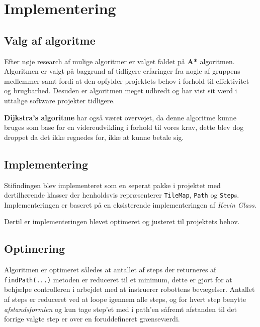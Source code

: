 \chapter{Implementering}

\section{Valg af algoritme}
Efter nøje research af mulige algoritmer er valget faldet på \textbf{A*} algoritmen.
Algoritmen er valgt på baggrund af tidligere erfaringer fra nogle af gruppens medlemmer samt fordi at den opfylder projektets behov i forhold til effektivitet og brugbarhed. Desuden er algoritmen meget udbredt og har vist sit værd i uttalige software projekter tidligere.

\textbf{Dijkstra's algoritme} har også været overvejet, da denne algoritme kunne bruges som base for en videreudvikling i forhold til vores krav, dette blev dog droppet da det ikke regnedes for, ikke at kunne betale sig.

\section{Implementering}
Stifindingen blev implementeret som en seperat pakke i projektet med dertilhørende klasser der henholdsvis repræsenterer \texttt{TileMap}, \texttt{Path} og \texttt{Step}s. Implementeringen er baseret på en eksisterende implementeringen af \textit{Kevin Glass}.

Dertil er implementeringen blevet optimeret og justeret til projektets behov.

\section{Optimering}
Algoritmen er optimeret således at antallet af steps der returneres af \texttt{findPath(...)} metoden er reduceret til et minimum, dette er gjort for at behjælpe controlleren i arbejdet med at instruerer robottens bevægelser. Antallet af steps er reduceret ved at loope igennem alle steps, og for hvert step benytte \textit{afstandsformlen} og kun tage step'et med i path'en såfremt afstanden til det forrige valgte step er over en foruddefineret grænseværdi.